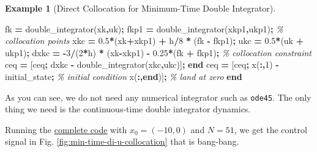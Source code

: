 \documentclass[
]{book}
\newenvironment{Shaded}{\begin{snugshade}}{\end{snugshade}}
\newcommand{\CommentTok}[1]{\textcolor[rgb]{0.56,0.35,0.01}{\textit{#1}}}
\newcommand{\FloatTok}[1]{\textcolor[rgb]{0.00,0.00,0.81}{#1}}
\newcommand{\KeywordTok}[1]{\textcolor[rgb]{0.13,0.29,0.53}{\textbf{#1}}}
\newcommand{\NormalTok}[1]{#1}
\newcommand{\OperatorTok}[1]{\textcolor[rgb]{0.81,0.36,0.00}{\textbf{#1}}}
\newcommand{\VariableTok}[1]{\textcolor[rgb]{0.00,0.00,0.00}{#1}}
\theoremstyle{definition}
\theoremstyle{definition}
\newtheorem{example}{Example}[chapter]
\theoremstyle{definition}
\theoremstyle{definition}
\theoremstyle{remark}
\begin{document}
\begin{example}[Direct Collocation for Minimum-Time Double Integrator]
\begin{Shaded}
\begin{Highlighting}[]
    \VariableTok{fk} \OperatorTok{=} \VariableTok{double\_integrator}\NormalTok{(}\VariableTok{xk}\OperatorTok{,}\VariableTok{uk}\NormalTok{)}\OperatorTok{;}
    \VariableTok{fkp1} \OperatorTok{=} \VariableTok{double\_integrator}\NormalTok{(}\VariableTok{xkp1}\OperatorTok{,}\VariableTok{ukp1}\NormalTok{)}\OperatorTok{;}
    \CommentTok{\% collocation points}
    \VariableTok{xkc} \OperatorTok{=} \FloatTok{0.5}\OperatorTok{*}\NormalTok{(}\VariableTok{xk}\OperatorTok{+}\VariableTok{xkp1}\NormalTok{) }\OperatorTok{+} \VariableTok{h}\OperatorTok{/}\FloatTok{8} \OperatorTok{*}\NormalTok{ (}\VariableTok{fk} \OperatorTok{{-}} \VariableTok{fkp1}\NormalTok{)}\OperatorTok{;}
    \VariableTok{ukc} \OperatorTok{=} \FloatTok{0.5}\OperatorTok{*}\NormalTok{(}\VariableTok{uk} \OperatorTok{+} \VariableTok{ukp1}\NormalTok{)}\OperatorTok{;}
    \VariableTok{dxkc} \OperatorTok{=} \OperatorTok{{-}}\FloatTok{3}\OperatorTok{/}\NormalTok{(}\FloatTok{2}\OperatorTok{*}\VariableTok{h}\NormalTok{) }\OperatorTok{*}\NormalTok{ (}\VariableTok{xk}\OperatorTok{{-}}\VariableTok{xkp1}\NormalTok{) }\OperatorTok{{-}} \FloatTok{0.25}\OperatorTok{*}\NormalTok{(}\VariableTok{fk} \OperatorTok{+} \VariableTok{fkp1}\NormalTok{)}\OperatorTok{;}
    \CommentTok{\% collocation constraint}
    \VariableTok{ceq} \OperatorTok{=}\NormalTok{ [}\VariableTok{ceq}\OperatorTok{;}
           \VariableTok{dxkc} \OperatorTok{{-}} \VariableTok{double\_integrator}\NormalTok{(}\VariableTok{xkc}\OperatorTok{,}\VariableTok{ukc}\NormalTok{)]}\OperatorTok{;}
\KeywordTok{end}
\VariableTok{ceq} \OperatorTok{=}\NormalTok{ [}\VariableTok{ceq}\OperatorTok{;}
       \VariableTok{x}\NormalTok{(}\OperatorTok{:,}\FloatTok{1}\NormalTok{) }\OperatorTok{{-}} \VariableTok{initial\_state}\OperatorTok{;} \CommentTok{\% initial condition}
       \VariableTok{x}\NormalTok{(}\OperatorTok{:,}\KeywordTok{end}\NormalTok{)]}\OperatorTok{;} \CommentTok{\% land at zero}
\KeywordTok{end}
\end{Highlighting}
\end{Shaded}

As you can see, we do not need any numerical integrator such as \texttt{ode45}. The only thing we need is the continuous-time double integrator dynamics.

Running the \href{https://github.com/ComputationalRobotics/OptimalControlEstimation-Examples/blob/main/double_integrator_collocation.m}{complete code} with \(x_0 = (-10,0)\) and \(N=51\), we get the control signal in Fig. \ref{fig:min-time-di-u-collocation} that is bang-bang.

\begin{figure}


\end{figure}
\end{example}
\end{document}
